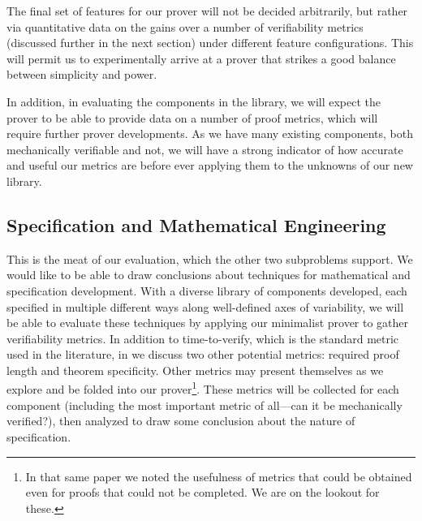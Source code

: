 The final set of features for our prover will not be decided arbitrarily, but rather via quantitative data on the gains over a number of verifiability metrics (discussed further in the next section) under different feature configurations.  This will permit us to experimentally arrive at a prover that strikes a good balance between simplicity and power.

In addition, in evaluating the components in the library, we will expect the prover to be able to provide data on a number of proof metrics, which will require further prover developments.  As we have many existing components, both mechanically verifiable and not, we will have a strong indicator of how accurate and useful our metrics are before ever applying them to the unknowns of our new library.

\subsection{Specification and Mathematical Engineering}\label{sec:evalEngineering}
This is the meat of our evaluation, which the other two subproblems support.  We would like to be able to draw conclusions about techniques for mathematical and specification development.  With a diverse library of components developed, each specified in multiple different ways along well-defined axes of variability, we will be able to evaluate these techniques by applying our minimalist prover to gather verifiability metrics.  In addition to time-to-verify, which is the standard metric used in the literature, in \cite{smithSpecificationAbstractions} we discuss two other potential metrics: required proof length and theorem specificity.  Other metrics may present themselves as we explore and be folded into our prover\footnote{In that same paper we noted the usefulness of metrics that could be obtained even for proofs that could not be completed.  We are on the lookout for these.}.  These metrics will be collected for each component (including the most important metric of all---can it be mechanically verified?), then analyzed to draw some conclusion about the nature of specification.
